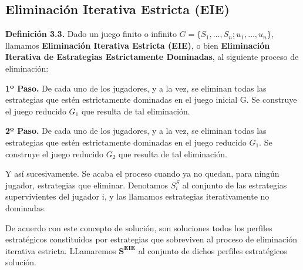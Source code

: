 \documentclass[12pt,a4paper,]{book}
\numberwithin{dummy}{section}
\theoremstyle{ocrenumbox}
\theoremstyle{blacknumex}
\theoremstyle{blacknumbox}
\theoremstyle{ocrenum}
\theoremstyle{ocrenum}
\begin{document}
\subsection{Eliminación Iterativa Estricta
(EIE)}\label{eliminaciuxf3n-iterativa-estricta-eie}

\textbf{Definición 3.3.} Dado un juego finito o infinito
\(G = \{S_1, \ldots, S_n; u_1, \ldots, u_n\}\), llamamos
\textbf{Eliminación Iterativa Estricta (EIE)}, o bien
\textbf{Eliminación Iterativa de Estrategias Estrictamente Dominadas},
al siguiente proceso de eliminación:

\textbf{1º Paso.} De cada uno de los jugadores, y a la vez, se eliminan
todas las estrategias que estén estrictamente dominadas en el juego
inicial G. Se construye el juego reducido \(G_1\) que resulta de tal
eliminación.

\textbf{2º Paso.} De cada uno de los jugadores, y a la vez, se eliminan
todas las estrategias que estén estrictamente dominadas en el juego
reducido \(G_1\). Se construye el juego reducido \(G_2\) que resulta de
tal eliminación.

Y así sucesivamente. Se acaba el proceso cuando ya no quedan, para
ningún jugador, estrategias que eliminar. Denotamos \(S^S_i\) al
conjunto de las estrategias supervivientes del jugador i, y las llamamos
estrategias iterativamente no dominadas.

De acuerdo con este concepto de solución, son soluciones todos los
perfiles estratégicos constituidos por estrategias que sobreviven al
proceso de eliminación iterativa estricta. LLamaremos
\(\mathbf{S^{EIE}}\) al conjunto de dichos perfiles estratégicos
solución.
\end{document}

